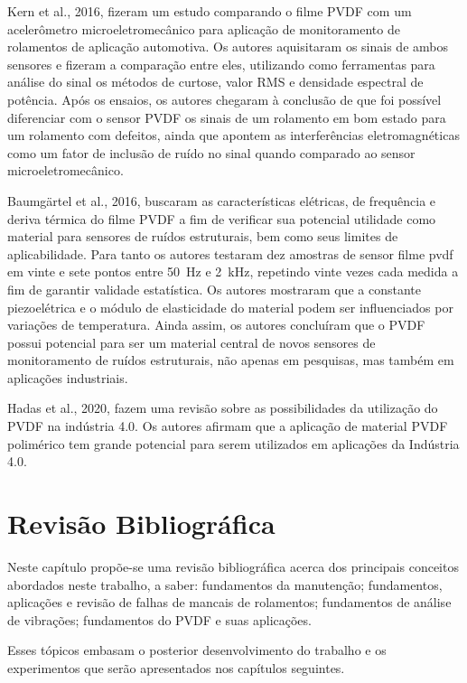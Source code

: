 \documentclass[
	12pt,				
	oneside,			
	a4paper,			
	english,			
	brazil,			
	]{abntex2ppgsi}
\begin{document}
Kern et al., 2016, fizeram um estudo comparando o filme PVDF com um acelerômetro microeletromecânico para aplicação de monitoramento de rolamentos de aplicação automotiva. Os autores aquisitaram os sinais de ambos sensores e fizeram a comparação entre eles, utilizando como ferramentas para análise do sinal os métodos de curtose, valor RMS e densidade espectral de potência. Após os ensaios, os autores chegaram à conclusão de que foi possível diferenciar com o sensor PVDF os sinais de um rolamento em bom estado para um rolamento com defeitos, ainda que apontem as interferências eletromagnéticas como um fator de inclusão de ruído no sinal quando comparado ao sensor microeletromecânico.

Baumgärtel et al., 2016, buscaram as características elétricas, de frequência e deriva térmica do filme PVDF a fim de verificar sua potencial utilidade como material para sensores de ruídos estruturais, bem como seus limites de aplicabilidade. Para tanto os autores testaram dez amostras de sensor filme pvdf em vinte e sete pontos entre \SI{50}{\hertz} e \SI{2}{\kilo\hertz}, repetindo vinte vezes cada medida a fim de garantir validade estatística. Os autores mostraram que a constante piezoelétrica e o módulo de elasticidade do material podem ser influenciados por variações de temperatura. Ainda assim, os autores concluíram que o PVDF possui potencial para ser um material central de novos sensores de monitoramento de ruídos estruturais, não apenas em pesquisas, mas também em aplicações industriais.

Hadas et al., 2020, fazem uma revisão sobre as possibilidades da utilização do PVDF na indústria 4.0. Os autores afirmam que a aplicação de material PVDF polimérico tem grande potencial para serem utilizados em aplicações da Indústria 4.0. 


\chapter{Revisão Bibliográfica}

Neste capítulo propõe-se uma revisão bibliográfica acerca dos principais conceitos abordados neste trabalho, a saber: fundamentos da manutenção; fundamentos, aplicações e revisão de falhas de mancais de rolamentos; fundamentos de análise de vibrações; fundamentos do PVDF e suas aplicações. 

Esses tópicos embasam o posterior desenvolvimento do trabalho e os experimentos que serão apresentados nos capítulos seguintes.
\end{document}
